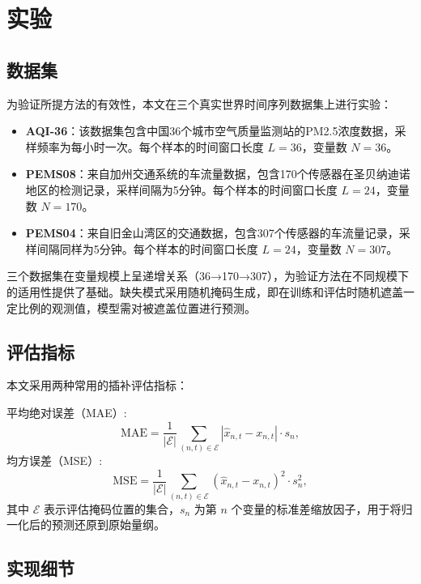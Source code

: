 \section{实验}

\subsection{数据集}

为验证所提方法的有效性，本文在三个真实世界时间序列数据集上进行实验：

\begin{itemize}
    \item \textbf{AQI-36}：该数据集包含中国36个城市空气质量监测站的PM2.5浓度数据，采样频率为每小时一次。每个样本的时间窗口长度 $L=36$，变量数 $N=36$。
    \item \textbf{PEMS08}：来自加州交通系统的车流量数据，包含170个传感器在圣贝纳迪诺地区的检测记录，采样间隔为5分钟。每个样本的时间窗口长度 $L=24$，变量数 $N=170$。
    \item \textbf{PEMS04}：来自旧金山湾区的交通数据，包含307个传感器的车流量记录，采样间隔同样为5分钟。每个样本的时间窗口长度 $L=24$，变量数 $N=307$。
\end{itemize}

三个数据集在变量规模上呈递增关系（36→170→307），为验证方法在不同规模下的适用性提供了基础。缺失模式采用随机掩码生成，即在训练和评估时随机遮盖一定比例的观测值，模型需对被遮盖位置进行预测。

\subsection{评估指标}

本文采用两种常用的插补评估指标：

平均绝对误差（MAE）:
\begin{equation}
\mathrm{MAE} = \frac{1}{|\mathcal{E}|} \sum_{(n,t)\in\mathcal{E}} |\hat{x}_{n,t} - x_{n,t}| \cdot s_n,
\end{equation}
均方误差（MSE）:
\begin{equation}
\mathrm{MSE} = \frac{1}{|\mathcal{E}|} \sum_{(n,t)\in\mathcal{E}} (\hat{x}_{n,t} - x_{n,t})^2 \cdot s_n^2,
\end{equation}
其中 $\mathcal{E}$ 表示评估掩码位置的集合，$s_n$ 为第 $n$ 个变量的标准差缩放因子，用于将归一化后的预测还原到原始量纲。

\subsection{实现细节}

